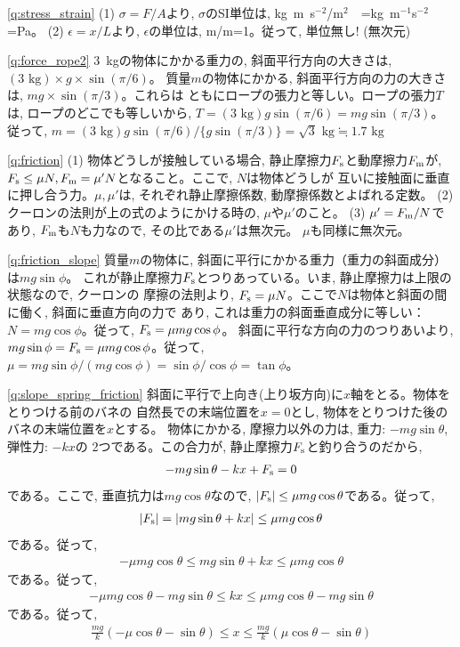 \ref{q:stress_strain}
(1) $\sigma=F/A$より, $\sigma$のSI単位は, kg~m~s$^{-2}$/m$^2$　=kg~m$^{-1}$s$^{-2}$=Pa。
(2) $\epsilon=x/L$より, $\epsilon$の単位は, m/m=1。従って, 単位無し! (無次元)\mv

\ref{q:force_rope2}
3~kgの物体にかかる重力の, 斜面平行方向の大きさは, $(3\text{ kg})\times g\times \sin (\pi/6)$。
質量$m$の物体にかかる, 斜面平行方向の力の大きさは, $mg\times \sin (\pi/3)$。これらは
ともにロープの張力と等しい。ロープの張力$T$は, ロープのどこでも等しいから, 
$T=(3\text{ kg}) g \sin (\pi/6)=mg \sin (\pi/3)$。従って, 
$m=(3\text{ kg})g\sin(\pi/6)/\{g\sin(\pi/3)\}=\sqrt{3}\text{ kg}\fallingdotseq 1.7\text{ kg}$
\mv

\ref{q:friction}
(1) 物体どうしが接触している場合, 静止摩擦力$F_{\text s}$と動摩擦力$F_{\text m}$が, 
$F_{\text s} \leq \mu N, F_{\text m}=\mu' N$となること。ここで, $N$は物体どうしが
互いに接触面に垂直に押し合う力。$\mu, \mu'$は, それぞれ静止摩擦係数, 
動摩擦係数とよばれる定数。
(2) クーロンの法則が上の式のようにかける時の, $\mu$や$\mu'$のこと。
(3) $\mu'=F_{\text m}/N$であり, $F_{\text m}$も$N$も力なので, その比である$\mu'$は無次元。
$\mu$も同様に無次元。
\mv

\ref{q:friction_slope} 
質量$m$の物体に, 斜面に平行にかかる重力（重力の斜面成分）は$mg \sin \phi$。
これが静止摩擦力$F_{\text s}$とつりあっている。いま, 静止摩擦力は上限の状態なので, クーロンの
摩擦の法則より, $F_{\text s}=\mu N$。ここで$N$は物体と斜面の間に働く, 斜面に垂直方向の力で
あり, これは重力の斜面垂直成分に等しい：$N=mg\cos\phi$。従って, $F_{\text s}=\mu mg\cos\phi$。
斜面に平行な方向の力のつりあいより, $mg \sin \phi=F_{\text s}=\mu mg\cos\phi$。従って, 
$\mu=mg\sin\phi/(mg\cos\phi)=\sin\phi/\cos\phi=\tan\phi$。\mv

\ref{q:slope_spring_friction} 
斜面に平行で上向き(上り坂方向)に$x$軸をとる。物体をとりつける前のバネの
自然長での末端位置を$x=0$とし, 物体をとりつけた後のバネの末端位置を$x$とする。
物体にかかる, 摩擦力以外の力は, 重力: $-mg\sin\theta$, 弾性力: $-kx$の
2つである。この合力が, 静止摩擦力$F_{\text s}$と釣り合うのだから, 
\begin{eqnarray}-mg\sin\theta-kx+F_{\text s}=0\end{eqnarray}
である。ここで, 垂直抗力は$mg\cos\theta$なので, 
$|F_{\text s}|\leq\mu mg\cos\theta$である。従って, 
\begin{eqnarray}|F_{\text s}|=|mg\sin\theta+kx|\leq\mu mg\cos\theta\end{eqnarray}
である。従って, 
\begin{eqnarray}-\mu mg\cos\theta\leq mg\sin\theta+kx\leq\mu mg\cos\theta\end{eqnarray}
である。従って, 
\begin{eqnarray*}-\mu mg\cos\theta-mg\sin\theta\leq kx\leq\mu mg\cos\theta-mg\sin\theta\end{eqnarray*}
である。従って, 
\begin{eqnarray*}\frac{mg}{k}(-\mu \cos\theta-\sin\theta)\leq x\leq\frac{mg}{k}(\mu \cos\theta-\sin\theta)\end{eqnarray*}\mv



